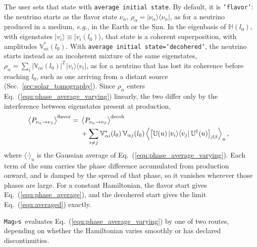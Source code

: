 \documentclass[final,5p,times,twocolumn,sort,compress]{elsarticle}
\makeatletter
\newcommand{\eg}{{\it e.g.}}
\newcommand{\eq}{Eq.}
\DeclareRobustCommand{\_}{%
  \ifmmode\nfss@text{\textunderscore}\else\textunderscore\allowbreak\fi}
\newcommand{\equ}[1]{\eq~(\ref{equ:#1})}
\newcommand{\magnus}{{\tt Mag}\ensuremath{\nu}{\tt s}}
\makeatother
\begin{document}
The user sets that state with {\tt average\_initial\_state}. By default, it is {\tt 'flavor'}: the neutrino starts as the flavor state $\nu_\alpha$, $\rho_\alpha = \lvert \nu_\alpha \rangle \langle \nu_\alpha \rvert$, as for a neutrino produced in a medium, \eg, in the Earth or the Sun. In the eigenbasis of $\mathbb{H}(l_0)$, with eigenstates $\lvert v_i \rangle \equiv \lvert v_i(l_0) \rangle$, that state is a coherent superposition, with amplitudes $\mathbb{V}^\ast_{\alpha i}(l_0)$. With {\tt average\_initial\_state='decohered'}, the neutrino starts instead as an incoherent mixture of the same eigenstates, $\rho_\alpha = \sum_i \lvert \mathbb{V}_{\alpha i}(l_0)\rvert^2\, \lvert v_i \rangle \langle v_i \rvert$, as for a neutrino that has lost its coherence before reaching $l_0$, such as one arriving from a distant source (Sec.~\ref{sec:solar_tomography}). Since $\rho_\alpha$ enters \equ{phase_average_varying} linearly, the two differ only by the interference between eigenstates present at production,
\begin{align}
 \label{equ:flavor_vs_decohered}
 \left\langle P_{\nu_\alpha \to \nu_\beta} \right\rangle^{\rm flavor}
 =\;
 & \left\langle P_{\nu_\alpha \to \nu_\beta} \right\rangle^{\rm decoh}
 \\
 & + \sum_{i \neq j} \mathbb{V}^\ast_{\alpha i}(l_0)\, \mathbb{V}_{\alpha j}(l_0)
 \left\langle \left[ \mathbb{U}(u)\, \lvert v_i \rangle \langle v_j \rvert\, \mathbb{U}^\dagger(u) \right]_{\beta\beta} \right\rangle_u ,
 \nonumber
\end{align}
where $\langle \cdot \rangle_u$ is the Gaussian average of \equ{phase_average_varying}. Each term of the sum carries the phase difference accumulated from production onward, and is damped by the spread of that phase, so it vanishes wherever those phases are large. For a constant Hamiltonian, the flavor start gives \equ{phase_average}, and the decohered start gives the limit \equ{averaged} exactly.

\magnus\ evaluates \equ{phase_average_varying} by one of two routes, depending on whether the Hamiltonian varies smoothly or has declared discontinuities.

\smallskip
\end{document}

